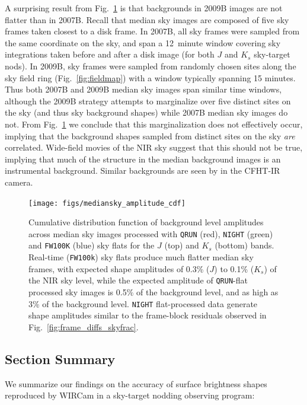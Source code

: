 \documentclass[iop]{emulateapj}
\newcommand{\Fig}[1]{Fig.~\ref{fig:#1}}  %
\begin{document}
A surprising result from \Fig{mediansky_amplitude} is that backgrounds in 2009B images are not flatter than in 2007B.
Recall that median sky images are composed of five sky frames taken closest to a disk frame.
In 2007B, all sky frames were sampled from the same coordinate on the sky, and span a 12~minute window covering sky integrations taken before and after a disk image (for both $J$ and $K_s$ sky-target nods).
In 2009B, sky frames were sampled from randomly chosen sites along the sky field ring (\Fig{fieldmap}) with a window typically spanning 15 minutes.
Thus both 2007B and 2009B median sky images span similar time windows, although the 2009B strategy attempts to marginalize over five distinct sites  on the sky (and thus sky background shapes) while 2007B median sky images do not.
From \Fig{mediansky_amplitude} we conclude that this marginalization does not effectively occur, implying that the background shapes sampled from distinct sites on the sky \emph{are} correlated.
Wide-field movies of the NIR sky \citep{Adams:1996} suggest that this should not be true, implying that much of the structure in the median background images is an instrumental background.
Similar backgrounds are seen by \cite{Vaduvescu:2004} in the CFHT-IR camera.

\begin{figure}[t]
\centering
\texttt{[image: figs/mediansky\_amplitude\_cdf]}
\caption{Cumulative distribution function of background level amplitudes across median sky images processed with \texttt{QRUN} (red), \texttt{NIGHT} (green) and \texttt{FW100K} (blue) sky flats for the $J$ (top) and $K_s$ (bottom) bands. Real-time (\texttt{FW100k}) sky flats produce much flatter median sky frames, with expected shape amplitudes of 0.3\% ($J$) to 0.1\% ($K_s$) of the NIR sky level, while the expected amplitude of \texttt{QRUN}-flat processed sky images is 0.5\% of the background level, and as high as 3\% of the background level. \texttt{NIGHT} flat-processed data generate shape amplitudes similar to the frame-block residuals observed in \Fig{frame_diffs_skyfrac}.
}
\label{fig:mediansky_amplitude}
\end{figure}


\subsection{Section Summary}
\label{sec:shapeconclusions}

We summarize our findings on the accuracy of surface brightness shapes reproduced by WIRCam in a sky-target nodding observing program:
\end{document}
